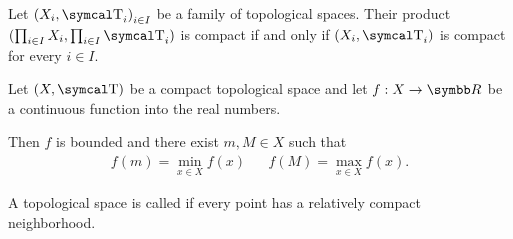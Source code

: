 \begin{theorem}\label{thm:tychonoffs_product_theorem}\cite[theorem 3.2.4]{Engelking1989}
  Let \( { (X_i, \CT_i) }_{i \in I} \) be a family of topological spaces. Their product \( (\prod_{i \in I} X_i, \prod_{i \in I} \CT_i) \) is compact if and only if \( (X_i, \CT_i) \) is compact for every \( i \in I \).

\end{theorem}

\begin{theorem}\label{thm:weierstrass_extreme_value_theorem}
  Let \( (X, \CT) \) be a compact topological space and let \( f: X \to \BR \) be a continuous function into the real numbers.

  Then \( f \) is bounded and there exist \( m, M \in X \) such that
  \begin{align*}
    f(m) = \min_{x \in X} f(x)
    &&
    f(M) = \max_{x \in X} f(x).
  \end{align*}
\end{theorem}

\begin{definition}\label{def:locally_compact_space}\cite[148]{Engelking1989}
  A topological space is called  if every point has a relatively compact neighborhood.
\end{definition}
